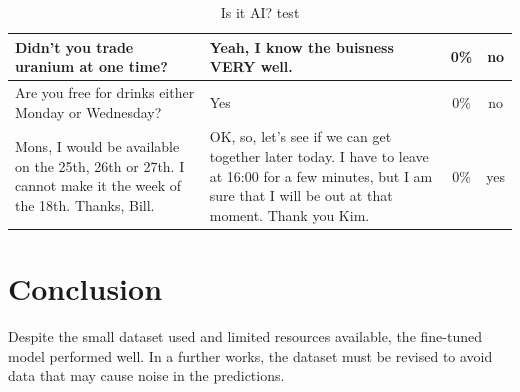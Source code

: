 \documentclass[letterpaper]{article}
\begin{document}
\begin{table}[ht]
\begin{tabularx}{\textwidth}{|X|X|c|c|}
        \hline
        Didn't you trade uranium at one time?                                                                                                                                                                 & Yeah, I know the buisness VERY well.                                                                                                                                                                                               & \num{0}{\%}  & no                \\
        \hline
        Are you free for drinks either Monday or Wednesday?                                                                                                                                                   & Yes                                                                                                                                                                                                                                & \num{0}{\%}  & no                \\
        \hline
        Mons, I would be available on the 25th, 26th or 27th. I cannot make it the week of the 18th. Thanks, Bill.                                                                                            & OK, so, let's see if we can get together later today. I have to leave at 16:00 for a few minutes, but I am sure that I will be out at that moment. Thank you Kim.                                                                  & \num{0}{\%}  & yes               \\
        \hline
    \end{tabularx}
    \caption{Is it AI? test}
    \label{table:is-it-ai-test}
\end{table}



\section{Conclusion}

Despite the small dataset used and limited resources available, the fine-tuned model performed well. In a further works, the dataset must be revised to avoid data that may cause noise in the predictions.





\end{document}
